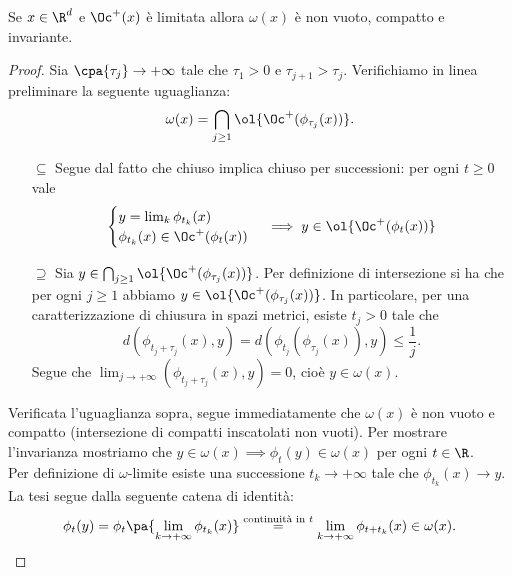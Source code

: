 \begin{proposition}\label{OrbitaPositivaLimitataImplicaCompattezzaEInvarianzaOmegaLimite}
Se $x\in\R^d$ e $\Oc^+(x)$ \`e limitata allora $\omega(x)$ \`e non vuoto, compatto e invariante.
\end{proposition}
\begin{proof}
Sia $\cpa{\tau_j}\to+\infty$ tale che $\tau_1>0$ e $\tau_{j+1}>\tau_j$. 
Verifichiamo in linea preliminare la seguente uguaglianza:
\[\omega(x)=\bigcap_{j\geq 1}\ol{\Oc^+(\phi_{\tau_j}(x))}.\]
\setlength{\leftmargini}{0cm}  
\begin{itemize}
\item[$\boxed{\subseteq}$] Segue dal fatto che chiuso implica chiuso per successioni: per ogni $t\geq 0$ vale
\[\begin{cases}
y=\lim_k\phi_{t_k}(x)\\
\phi_{t_k}(x)\in \Oc^+(\phi_t(x))
\end{cases}\implies y\in \ol{\Oc^+(\phi_t(x))}\]
\item[$\boxed{\supseteq}$] Sia $y\in \bigcap_{j\geq 1}\ol{\Oc^+(\phi_{\tau_j}(x))}$. Per definizione di intersezione si ha che per ogni $j\geq 1$ abbiamo $y\in\ol{\Oc^+(\phi_{\tau_j}(x))}$. In particolare, per una caratterizzazione di chiusura in spazi metrici, esiste $t_j>0$ tale che
\[d(\phi_{t_j+\tau_j}(x),y)=d(\phi_{t_j}(\phi_{\tau_j}(x)),y)\leq \frac1j.\]
Segue che $\displaystyle\lim_{j\to+\infty}(\phi_{t_j+\tau_j}(x),y)=0$, cio\`e $y\in \omega(x)$.
\end{itemize}
Verificata l'uguaglianza sopra, segue immediatamente che $\omega(x)$ \`e non vuoto e compatto (intersezione di compatti inscatolati non vuoti). Per mostrare l'invarianza mostriamo che $y\in\omega(x)\implies \phi_t(y)\in\omega(x)$ per ogni $t\in\R$.\\
Per definizione di $\omega$-limite esiste una successione $t_k\to+\infty$ tale che $\phi_{t_k}(x)\to y$. La tesi segue dalla seguente catena di identit\`a:
\[\phi_t(y)=\phi_t\pa{\lim_{k\to+\infty}\phi_{t_k}(x)}\overset{\text{continuit\`a in $t$}}=\lim_{k\to+\infty}\phi_{t+t_k}(x)\in\omega(x).\]
\end{proof}

